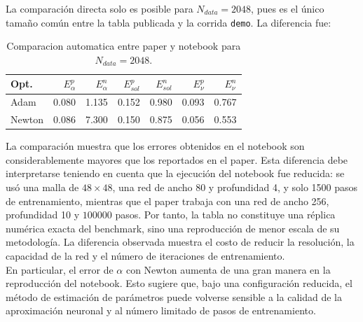\documentclass[10pt,letterpaper,twocolumn]{article}
\begin{document}
La comparación directa solo es posible para $N_{data}=2048$, pues es el único tamaño común entre la tabla publicada y la corrida \texttt{demo}. La diferencia fue:

\begin{table}[H]
\centering
\caption{Comparacion automatica entre paper y notebook para $N_{data}=2048$.}
\begin{tabular}{lrrrrrr}
\toprule
Opt. & $E_\alpha^p$ & $E_\alpha^n$ & $E_{sol}^p$ & $E_{sol}^n$ & $E_\nu^p$ & $E_\nu^n$ \\
\midrule
Adam & 0.080 & 1.135 & 0.152 & 0.980 & 0.093 & 0.767 \\
Newton & 0.086 & 7.300 & 0.150 & 0.875 & 0.056 & 0.553 \\
\bottomrule
\end{tabular}
\end{table}
La comparación muestra que los errores obtenidos en el notebook son considerablemente mayores que los reportados en el paper. Esta diferencia debe interpretarse teniendo en cuenta que la ejecución del notebook fue reducida: se usó una malla de $48\times48$, una red de ancho 80 y profundidad 4, y solo 1500 pasos de entrenamiento, mientras que el paper trabaja con una red de ancho 256, profundidad 10 y $100000$ pasos. Por tanto, la tabla no constituye una réplica numérica exacta del benchmark, sino una reproducción de menor escala de su metodología. La diferencia observada muestra el costo de reducir la resolución, la capacidad de la red y el número de iteraciones de entrenamiento.\\

En particular, el error de $\alpha$ con Newton aumenta de una gran manera en la reproducción del notebook. Esto sugiere que, bajo una configuración reducida, el método de estimación de parámetros puede volverse sensible a la calidad de la aproximación neuronal y al número limitado de pasos de entrenamiento.
\end{document}
